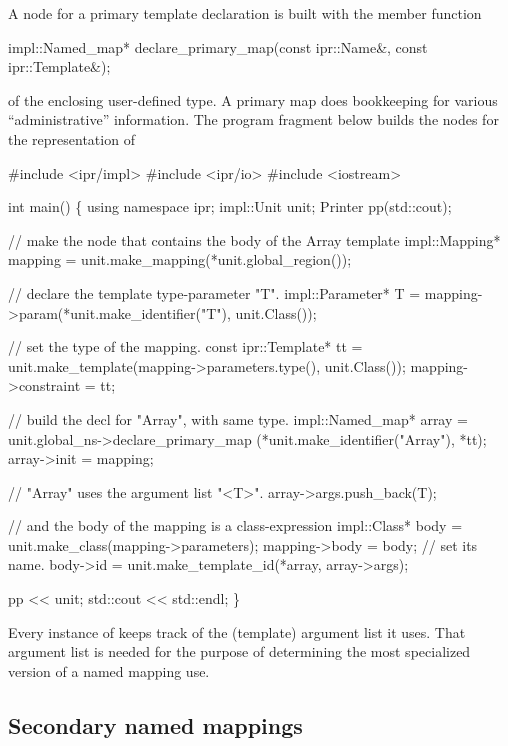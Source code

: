 \documentclass[a4paper,12pt]{article}
\begin{document}
A node for a primary template declaration is built with the member function  
\begin{Program}
  impl::Named_map* declare_primary_map(const ipr::Name&, const ipr::Template&);
\end{Program}
of the enclosing user-defined type.  A primary map does bookkeeping for
various ``administrative'' information.  The program fragment below builds the
nodes for the representation of 
\begin{Program}
#include <ipr/impl>
#include <ipr/io>
#include <iostream>

int main()
\{
   using namespace ipr;
   impl::Unit unit;
   Printer pp(std::cout);

   // make the node that contains the body of the Array template
   impl::Mapping* mapping = unit.make_mapping(*unit.global_region());

   // declare the template type-parameter "T".
   impl::Parameter* T = mapping->param(*unit.make_identifier("T"),
                                       unit.Class());

   // set the type of the mapping.
   const ipr::Template* tt = unit.make_template(mapping->parameters.type(),
                                                unit.Class());
   mapping->constraint = tt;

   // build the decl for "Array", with same type.
   impl::Named_map* array = unit.global_ns->declare_primary_map
      (*unit.make_identifier("Array"), *tt);
   array->init = mapping;

   // "Array" uses the argument list "<T>".
   array->args.push_back(T);

   // and the body of the mapping is a class-expression
   impl::Class* body = unit.make_class(mapping->parameters);
   mapping->body = body;
   // set its name.
   body->id = unit.make_template_id(*array, array->args);

   pp << unit;
   std::cout << std::endl;
\}
\end{Program}

Every instance of  keeps track of the (template) argument
list it uses.  That argument list is needed for the purpose of determining
the most specialized version of a named mapping use.

\subsection{Secondary named mappings}
\label{sec:named-mapping:secondary}
\end{document}
